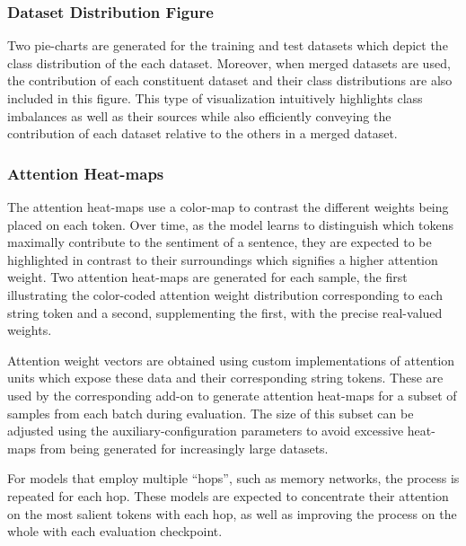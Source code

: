 \documentclass[../../fyp.tex]{subfiles}
\begin{document}
\subsubsection{Dataset Distribution Figure}
Two pie-charts are generated for the training and test datasets which depict the class distribution of the each dataset. Moreover, when merged datasets are used, the contribution of each constituent dataset and their class distributions are also included in this figure. This type of visualization intuitively highlights class imbalances as well as their sources while also efficiently conveying the contribution of each dataset relative to the others in a merged dataset.

\subsubsection{Attention Heat-maps}
The attention heat-maps use a color-map to contrast the different weights being placed on each token. Over time, as the model learns to distinguish which tokens maximally contribute to the sentiment of a sentence, they are expected to be highlighted in contrast to their surroundings which signifies a higher attention weight. Two attention heat-maps are generated for each sample, the first illustrating the color-coded attention weight distribution corresponding to each string token and a second, supplementing the first, with the precise real-valued weights.

Attention weight vectors are obtained using custom implementations of attention units which expose these data and their corresponding string tokens. These are used by the corresponding add-on to generate attention heat-maps for a subset of samples from each batch during evaluation. The size of this subset can be adjusted using the auxiliary-configuration parameters to avoid excessive heat-maps from being generated for increasingly large datasets. 

For models that employ multiple \enquote{hops}, such as memory networks, the process is repeated for each hop. These models are expected to concentrate their attention on the most salient tokens with each hop, as well as improving the process on the whole with each evaluation checkpoint.
\end{document}
